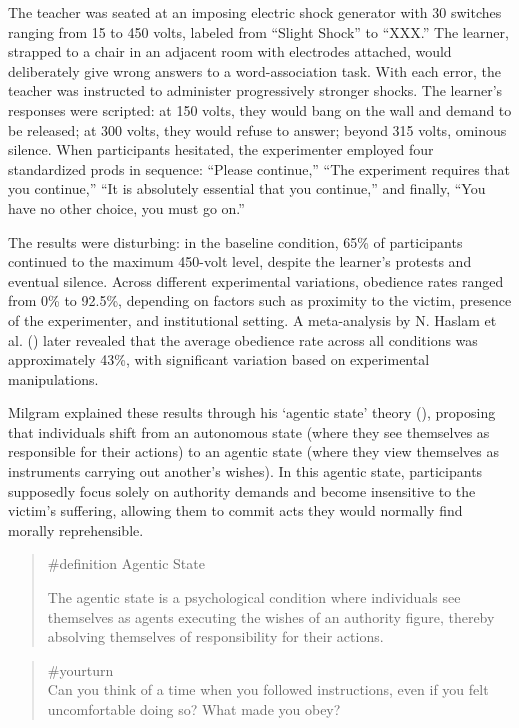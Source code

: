 \documentclass[
  letterpaper,
]{book}
\begin{document}
The teacher was seated at an imposing electric shock generator with 30
switches ranging from 15 to 450 volts, labeled from ``Slight Shock'' to
``XXX.'' The learner, strapped to a chair in an adjacent room with
electrodes attached, would deliberately give wrong answers to a
word-association task. With each error, the teacher was instructed to
administer progressively stronger shocks. The learner's responses were
scripted: at 150 volts, they would bang on the wall and demand to be
released; at 300 volts, they would refuse to answer; beyond 315 volts,
ominous silence. When participants hesitated, the experimenter employed
four standardized prods in sequence: ``Please continue,'' ``The
experiment requires that you continue,'' ``It is absolutely essential
that you continue,'' and finally, ``You have no other choice, you must
go on.''

The results were disturbing: in the baseline condition, 65\% of
participants continued to the maximum 450-volt level, despite the
learner's protests and eventual silence. Across different experimental
variations, obedience rates ranged from 0\% to 92.5\%, depending on
factors such as proximity to the victim, presence of the experimenter,
and institutional setting. A meta-analysis by N. Haslam et al.
() later revealed that the
average obedience rate across all conditions was approximately 43\%,
with significant variation based on experimental manipulations.

Milgram explained these results through his `agentic state' theory
(), proposing that
individuals shift from an autonomous state (where they see themselves as
responsible for their actions) to an agentic state (where they view
themselves as instruments carrying out another's wishes). In this
agentic state, participants supposedly focus solely on authority demands
and become insensitive to the victim's suffering, allowing them to
commit acts they would normally find morally reprehensible.

\begin{quote}
\label{def-agenticstate}{\#definition} Agentic State

The agentic state is a psychological condition where individuals see
themselves as agents executing the wishes of an authority figure,
thereby absolving themselves of responsibility for their actions.
\end{quote}

\begin{quote}
{\#yourturn}\\
Can you think of a time when you followed instructions, even if you felt
uncomfortable doing so? What made you obey?
\end{quote}
\end{document}
